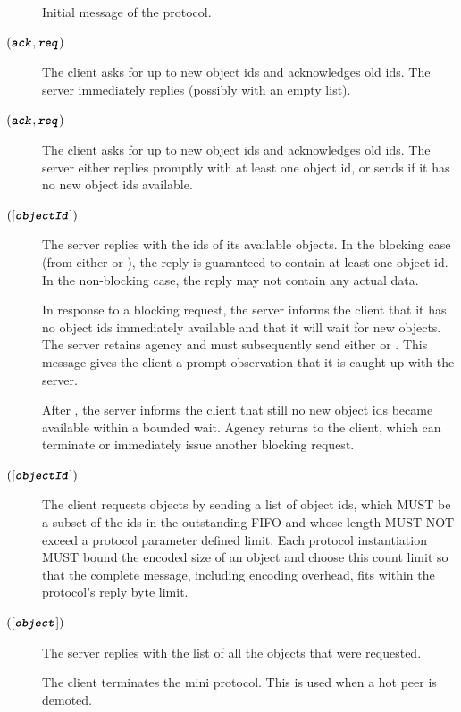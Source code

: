 \begin{description}
\item [\MsgInit{}]
      Initial message of the protocol.

\item [\MsgRequestObjIdsNB{} {$(\textbf{\texttt{\textit{ack}}},\textbf{\texttt{\textit{req}}})$}]
      The client asks for up to  new object ids and acknowledges  old ids.
      The server immediately replies (possibly with an empty list).

\item [\MsgRequestObjIdsB{} {$(\textbf{\texttt{\textit{ack}}},\textbf{\texttt{\textit{req}}})$}]
      The client asks for up to  new object ids and acknowledges  old ids.
      The server either replies promptly with at least one object id, or sends \MsgAwaitReply{} if it has no new object ids available.

\item [\MsgReplyObjIds{} {$([\textbf{\texttt{\textit{objectId}}}])$}]
      The server replies with the ids of its available objects.
      In the blocking case (from either \StObjIdsBlockingA{} or \StObjIdsBlockingR{}), the reply is guaranteed to contain at least one object id.
      In the non-blocking case, the reply may not contain any actual data.

\item [\MsgAwaitReply{}]
      In response to a blocking request, the server informs the client that it has no object ids immediately available and that it will wait for new objects.
      The server retains agency and must subsequently send either \MsgReplyObjIds{} or \MsgServerIdle{}.
      This message gives the client a prompt observation that it is caught up with the server.

\item [\MsgServerIdle{}]
      After \MsgAwaitReply{}, the server informs the client that still no new object ids became available within a bounded wait.
      Agency returns to the client, which can terminate or immediately issue another blocking request.

\item [\MsgRequestObjs{} {$([\textbf{\texttt{\textit{objectId}}}])$}]
      The client requests objects by sending a list of object ids, which MUST be
      a subset of the ids in the outstanding FIFO and whose length MUST NOT
      exceed a protocol parameter defined limit. Each protocol instantiation MUST
      bound the encoded size of an object and choose this count limit so that
      the complete \MsgReplyObjs{} message, including encoding overhead, fits
      within the protocol's reply byte limit.

\item [\MsgReplyObjs{} {$([\textbf{\texttt{\textit{object}}}])$}]
      The server replies with the list of all the objects that were requested.

\item [\MsgDone]
      The client terminates the mini protocol.
      This is used when a hot peer is demoted.
\end{description}

